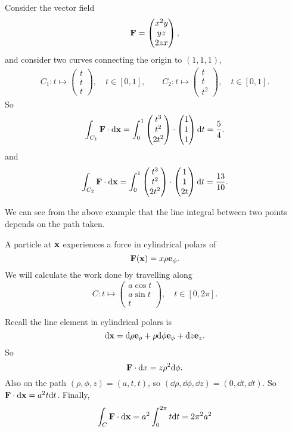 \documentclass[a4paper]{scrreprt}
\begin{document}
\begin{example}
	\label{ex:q}
	Consider the vector field 
	$$
	\mathbf{F} = \begin{pmatrix}
		x^2 y \\ yz \\ 2zx
	\end{pmatrix},
	$$
	and consider two curves connecting the origin to $(1, 1, 1)$,
	\begin{align*}
		C_1: t \longmapsto \begin{pmatrix}
			t \\ t\\ t
		\end{pmatrix}, \quad t \in [0, 1], \quad \quad
		C_2: t \longmapsto \begin{pmatrix}
			t \\ t\\ t^2
		\end{pmatrix}, \quad t \in [0, 1].
	\end{align*}
	So
	$$
	\int_{C_1} \mathbf{F} \cdot \mathrm{d} \mathbf{x}= \int_0^1 \begin{pmatrix}
		t^3 \\ t^2\\ 2t^2
	\end{pmatrix} \cdot \begin{pmatrix}
		1 \\ 1\\ 1
	\end{pmatrix} \mathrm{d} t = \frac{5}{4}.
	$$
	and
	$$
	\int_{C_2} \mathbf{F} \cdot \mathrm{d} \mathbf{x}= \int_0^1 \begin{pmatrix}
		t^3 \\ t^2\\ 2t^2
	\end{pmatrix} \cdot \begin{pmatrix}
		1 \\ 1\\ 2t
	\end{pmatrix} \mathrm{d} t = \frac{13}{10}.
	$$
\end{example}

We can see from the above example that the line integral between two points depends on the path taken.

\begin{example}
	A particle at $\mathbf{x}$ experiences a force in cylindrical polars of
	$$
	\mathbf{F}(\mathbf{x}) = x \rho \mathbf{e}_{\phi}.
	$$
	We will calculate the work done by travelling along
	$$
	C: t \longmapsto \begin{pmatrix}
		a \cos t \\ a \sin t \\ t
	\end{pmatrix}, \quad t \in [0, 2\pi].
	$$

	Recall the line element in cylindrical polars is
	$$
	\mathrm{d} \mathbf{x} = \mathrm{d} \rho \mathbf{e}_{\rho} + \rho \mathrm{d} \phi \mathbf{e}_{\phi} + \mathrm{d} z \mathbf{e}_z.
	$$
	So
	$$
\mathbf{F} \cdot \mathrm{d} x = z \rho^2 \mathrm{d} \phi.
	$$
	Also on the path $(\rho, \phi, z) = (a, t, t)$, so $(\dd \rho, \dd \phi, \dd z) = (0, \dd t, \dd t)$. So $\mathbf{F} \cdot \mathrm{d} \mathbf{x} = a^2 t \mathrm{d} t$. Finally,
	$$
	\int_C \mathbf{F} \cdot \mathrm{d} \mathbf{x} = a^2 \int_0^{2 \pi} t \mathrm{d} t = 2 \pi^2 a^2
	$$
\end{example}
\end{document}
